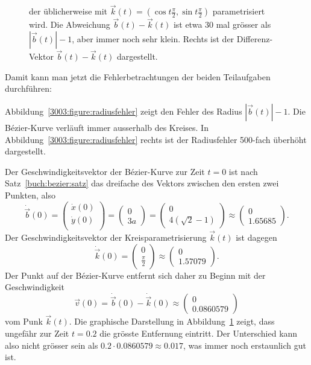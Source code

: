\begin{loesung}
\begin{figure}
{der üblicherweise mit $\vec{k}(t)=(\cos t\frac{\pi}2,\sin t\frac{\pi}2)$
parametrisiert wird.
Die Abweichung $\vec{b}(t)-\vec{k}(t)$ ist etwa 30 mal grösser als
$|\vec{b}(t)|-1$, aber immer noch sehr klein.
Rechts ist der Differenz-Vektor $\vec{b}(t)-\vec{k}(t)$ dargestellt.
\label{3003:figure:abweichungen}}
\end{figure}
Damit kann man jetzt die Fehlerbetrachtungen der beiden Teilaufgaben
durchführen:
\begin{teilaufgaben}
\item
Abbildung~\ref{3003:figure:radiusfehler} zeigt den Fehler des
Radius $|\vec{b}(t)|-1$.
Die Bézier-Kurve verläuft immer ausserhalb des Kreises.
In Abbildung~\ref{3003:figure:radiusfehler} rechts ist der Radiusfehler
500-fach überhöht dargestellt.
\item
Der Geschwindigkeitsvektor der Bézier-Kurve zur Zeit $t=0$ ist nach
Satz~\ref{buch:bezier:satz} das dreifache des Vektors zwischen den ersten
zwei Punkten, also
\[
\dot{\vec{b}}(0)
=
\begin{pmatrix}
\dot{x}(0)\\
\dot{y}(0)\\
\end{pmatrix}
=
\begin{pmatrix}
0\\
3a
\end{pmatrix}
=
\begin{pmatrix}
0
\\
4(\sqrt{2}-1)
\end{pmatrix}
\approx
\begin{pmatrix}
0
\\
1.65685
\end{pmatrix}.
\]
Der Geschwindigkeitsvektor der Kreisparametrisierung $\vec{k}(t)$ ist
dagegen
\[
\dot{\vec{k}}(0)
=
\begin{pmatrix}
0\\\frac\pi2
\end{pmatrix}
\approx
\begin{pmatrix}
0\\
1.57079
\end{pmatrix}.
\]
Der Punkt auf der Bézier-Kurve entfernt sich daher zu Beginn mit der
Geschwindigkeit
\[
\vec{v}(0)
=
\dot{\vec{b}}(0) - \dot{\vec{k}}(0)
\approx
\begin{pmatrix}
0
\\
0.0860579
\end{pmatrix}
\]
vom Punk $\vec{k}(t)$.
Die graphische Darstellung in Abbildung~\ref{3003:figure:abweichungen}
zeigt, dass ungefähr zur Zeit $t=0.2$ die grösste Entfernung eintritt.
Der Unterschied kann also nicht grösser sein als
$0.2\cdot 0.0860579\approx 0.017$, was immer noch erstaunlich gut ist.
\qedhere
\end{teilaufgaben}
\end{loesung}
